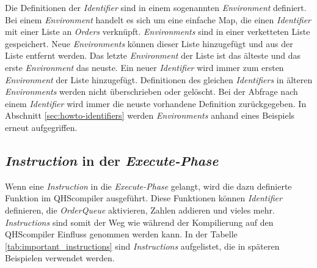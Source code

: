 Die Definitionen der \textit{Identifier} sind in einem sogenannten \textit{Environment} definiert.
Bei einem \textit{Environment} handelt es sich um eine einfache Map, die einen \textit{Identifier} mit einer Liste an \textit{Orders} verknüpft.
\textit{Environments} sind in einer verketteten Liste gespeichert. Neue \textit{Environments} können dieser Liste hinzugefügt und aus der Liste entfernt werden.
Das letzte \textit{Environment} der Liste ist das älteste und das erste \textit{Environment} das neuste.
Ein neuer \textit{Identifier} wird immer zum ersten \textit{Environment} der Liste hinzugefügt. Definitionen des gleichen \textit{Identifiers} in älteren \textit{Environments} werden nicht überschrieben oder gelöscht.
Bei der Abfrage nach einem \textit{Identifier} wird immer die neuste vorhandene Definition zurückgegeben.
In Abschnitt \ref{sec:howto-identifiers} werden \textit{Environments} anhand eines Beispiels erneut aufgegriffen.

\subsection{\textit{Instruction} in der \textit{Execute-Phase}}
Wenn eine \textit{Instruction} in die \textit{Execute-Phase} gelangt, wird die dazu definierte Funktion im QHScompiler ausgeführt.
Diese Funktionen können \textit{Identifier} definieren, die \textit{OrderQueue} aktivieren, Zahlen addieren und vieles mehr.
\textit{Instructions} sind somit der Weg wie während der Kompilierung auf den QHScompiler Einfluss genommen werden kann.
In der Tabelle \ref{tab:important_instructions} sind \textit{Instructions} aufgelistet, die in späteren Beispielen verwendet werden.

